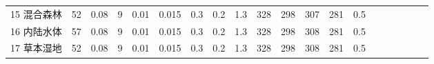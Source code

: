 \begin{sidewaystable}[]
\begin{tabular}{@{}lccccccccccccccccccc@{}}
    15 混合森林    & 52                                                                & 0.08                                                                                                   & 9                                                                                  & 0.01                                                                               & 0.015                                                               & 0.3                                                       & 0.2                                                       & 1.3                                                       & 328                                                             & 298                                                             & 307                                                              & 281                                                               & 0.5                                                          \\
    16 内陆水体    & 57                                                                & 0.08                                                                                                   & 9                                                                                  & 0.01                                                                               & 0.015                                                               & 0.3                                                       & 0.2                                                       & 1.3                                                       & 328                                                             & 298                                                             & 308                                                              & 281                                                               & 0.5                                                          \\
    17 草本湿地    & 52                                                                & 0.08                                                                                                   & 9                                                                                  & 0.01                                                                               & 0.015                                                               & 0.3                                                       & 0.2                                                       & 1.3                                                       & 328                                                             & 298                                                             & 308                                                              & 281                                                               & 0.5                                                          \\

\end{tabular}
\end{sidewaystable}
